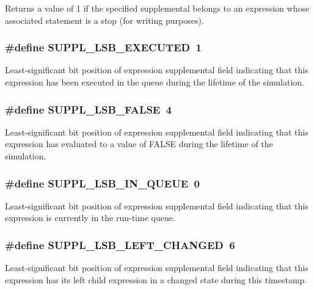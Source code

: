 Returns a value of 1 if the specified supplemental belongs to an expression whose associated statement is a stop (for writing purposes). 
\subsubsection{\setlength{\rightskip}{0pt plus 5cm}\#define SUPPL\_\-LSB\_\-EXECUTED\ 1}\label{group__expr__suppl_a1}


Least-significant bit position of expression supplemental field indicating that this expression has been executed in the queue during the lifetime of the simulation. 
\subsubsection{\setlength{\rightskip}{0pt plus 5cm}\#define SUPPL\_\-LSB\_\-FALSE\ 4}\label{group__expr__suppl_a4}


Least-significant bit position of expression supplemental field indicating that this expression has evaluated to a value of FALSE during the lifetime of the simulation. 
\subsubsection{\setlength{\rightskip}{0pt plus 5cm}\#define SUPPL\_\-LSB\_\-IN\_\-QUEUE\ 0}\label{group__expr__suppl_a0}


Least-significant bit position of expression supplemental field indicating that this expression is currently in the run-time queue. 
\subsubsection{\setlength{\rightskip}{0pt plus 5cm}\#define SUPPL\_\-LSB\_\-LEFT\_\-CHANGED\ 6}\label{group__expr__suppl_a6}


Least-significant bit position of expression supplemental field indicating that this expression has its left child expression in a changed state during this timestamp. 
